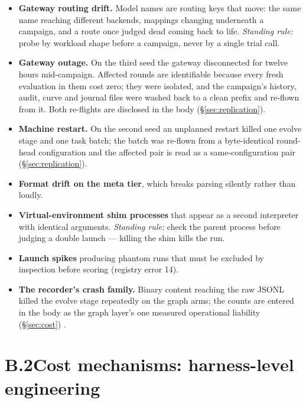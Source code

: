 \begin{itemize}
  \item \textbf{Gateway routing drift.} Model names are routing keys that
        move: the same name reaching different backends, mappings changing
        underneath a campaign, and a route once judged dead coming back to
        life. \emph{Standing rule:} probe by workload shape before a
        campaign, never by a single trial call.
  \item \textbf{Gateway outage.} On the third seed the gateway
        disconnected for twelve hours mid-campaign. Affected rounds are
        identifiable because every fresh evaluation in them cost zero;
        they were isolated, and the campaign's history, audit, curve and
        journal files were washed back to a clean prefix and re-flown from
        it. Both re-flights are disclosed in the body
        (\S\ref{sec:replication}).
  \item \textbf{Machine restart.} On the second seed an unplanned restart
        killed one evolve stage and one task batch; the batch was re-flown
        from a byte-identical round-head configuration and the affected
        pair is read as a same-configuration pair (\S\ref{sec:replication}).
  \item \textbf{Format drift on the meta tier}, which breaks parsing
        silently rather than loudly.
  \item \textbf{Virtual-environment shim processes} that appear as a second
        interpreter with identical arguments. \emph{Standing rule:} check
        the parent process before judging a double launch --- killing the
        shim kills the run.
  \item \textbf{Launch spikes} producing phantom runs that must be excluded
        by inspection before scoring (registry error 14).
  \item \textbf{The recorder's crash family.} Binary content reaching the
        raw JSONL killed the evolve stage repeatedly on the graph arms; the
        counts are entered in the body as the graph layer's one measured
        operational liability (\S\ref{sec:cost}) .
\end{itemize}

\section*{B.2\quad Cost mechanisms: harness-level engineering}
\label{app:cost}

